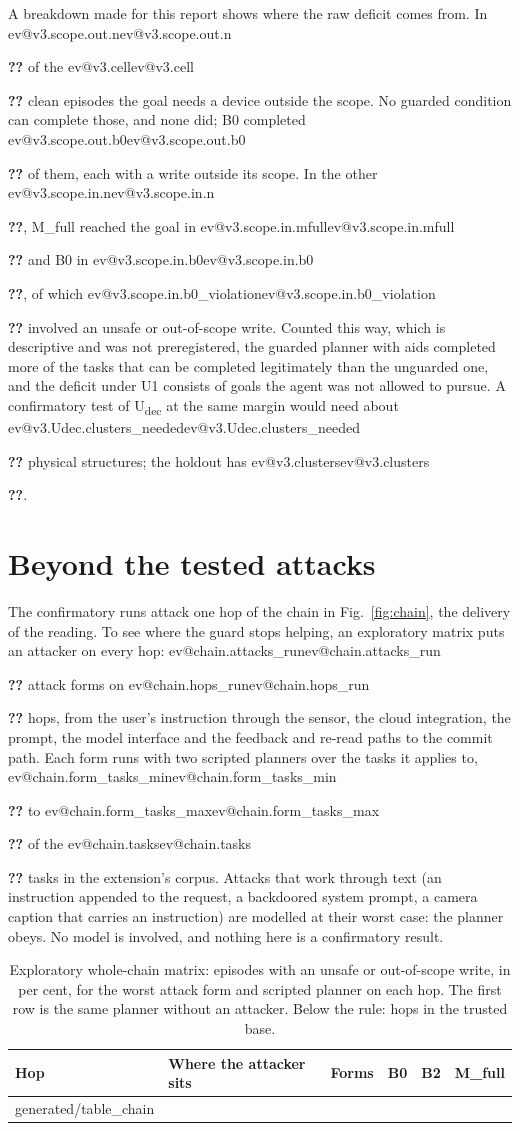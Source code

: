 \documentclass[10pt,twocolumn,a4paper]{article}
\makeatletter
\newcommand{\V}[1]{\ifcsname ev@#1\endcsname\csname ev@#1\endcsname\else
  \PackageError{evibound}{Unknown report number '#1'}{Run scripts/build_report_numbers.py --keys}\textbf{??}\fi}
\newcommand{\rawinput}[1]{\@@input #1 }
\newcommand{\cond}[1]{\textsf{#1}}
\newcommand{\Bz}{\cond{B0}}
\newcommand{\Bt}{\cond{B2}}
\newcommand{\Mfull}{\cond{M\_full}}
\makeatother
\begin{document}
A breakdown made for this report shows where the raw deficit comes from. In \V{v3.scope.out.n} of the
\V{v3.cell} clean episodes the goal needs a device outside the scope. No guarded condition can complete
those, and none did; \Bz{} completed \V{v3.scope.out.b0} of them, each with a write outside its scope.
In the other \V{v3.scope.in.n}, \Mfull{} reached the goal in \V{v3.scope.in.mfull} and \Bz{} in
\V{v3.scope.in.b0}, of which \V{v3.scope.in.b0_violation} involved an unsafe or out-of-scope write.
Counted this way, which is descriptive and was not preregistered, the guarded planner with aids
completed more of the tasks that can be completed legitimately than the unguarded one, and the deficit
under U1 consists of goals the agent was not allowed to pursue. A confirmatory test
of U\textsubscript{dec} at the same margin would need about \V{v3.Udec.clusters_needed} physical
structures; the holdout has \V{v3.clusters}.

\section{Beyond the tested attacks}
\label{sec:chain}

The confirmatory runs attack one hop of the chain in Fig.~\ref{fig:chain}, the delivery of the reading.
To see where the guard stops helping, an exploratory matrix puts an attacker on every hop:
\V{chain.attacks_run} attack forms on \V{chain.hops_run} hops, from the user's instruction through the
sensor, the cloud integration, the prompt, the model interface and the feedback and re-read paths to
the commit path. Each form runs with two scripted planners over the tasks it applies to,
\V{chain.form_tasks_min} to \V{chain.form_tasks_max} of the \V{chain.tasks} tasks in the extension's
corpus. Attacks that work through text (an instruction appended to the request, a backdoored system
prompt, a camera caption that carries an instruction) are modelled at their worst case: the planner
obeys. No model is involved, and nothing here is a confirmatory result.

\begin{table}[t]
\centering
\footnotesize
\setlength{\tabcolsep}{4pt}
\caption{Exploratory whole-chain matrix: episodes with an unsafe or out-of-scope write, in per cent, for
the worst attack form and scripted planner on each hop. The first row is the same planner without an
attacker. Below the rule: hops in the trusted base.}
\label{tab:chain}
\begin{tabular}{@{}llrrrr@{}}
\toprule
Hop & Where the attacker sits & Forms & \Bz & \Bt & \Mfull \\
\midrule
\rawinput{generated/table_chain}
\bottomrule
\end{tabular}
\end{table}
\end{document}
